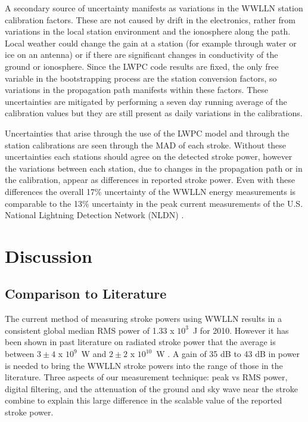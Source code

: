 A secondary source of uncertainty manifests as variations in the WWLLN station calibration factors.
These are not caused by drift in the electronics, rather from variations in the local station environment and the ionosphere along the path.
Local weather could change the gain at a station (for example through water or ice on an antenna) or if there are significant changes in conductivity of the ground or ionosphere.
Since the LWPC code results are fixed, the only free variable in the bootstrapping process are the station conversion factors, so variations in the propagation path manifests within these factors.
These uncertainties are mitigated by performing a seven day running average of the calibration values but they are still present as daily variations in the calibrations.

Uncertainties that arise through the use of the LWPC model and through the station calibrations are seen through the MAD of each stroke.
Without these uncertainties each stations should agree on the detected stroke power, however the variations between each station, due to changes in the propagation path or in the calibration, appear as differences in reported stroke power.
Even with these differences the overall 17\% uncertainty of the WWLLN energy measurements is comparable to the 13\% uncertainty in the peak current measurements of the U.S. National Lightning Detection Network (NLDN) \citep{Nag2011}.

\section{Discussion}

\subsection{Comparison to Literature}

The current method of measuring stroke powers using WWLLN results in a consistent global median RMS power of 1.33 x $10^3$~J for 2010.
However it has been shown in past literature on radiated stroke power that the average is between $3\pm4$ x $10^9$~W and  $2\pm2$ x $10^{10}$~W \citep{Krider1983}.
A gain of 35 dB to 43 dB in power is needed to bring the WWLLN stroke powers into the range of those in the literature.
Three aspects of our measurement technique: peak vs RMS power, digital filtering, and the attenuation of the ground and sky wave near the stroke combine to explain this large difference in the scalable value of the reported stroke power.

